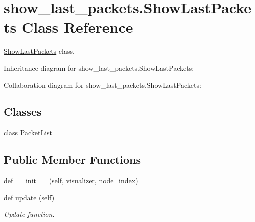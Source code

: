 \hypertarget{classshow__last__packets_1_1ShowLastPackets}{}\section{show\+\_\+last\+\_\+packets.\+Show\+Last\+Packets Class Reference}
\label{classshow__last__packets_1_1ShowLastPackets}


\hyperlink{classshow__last__packets_1_1ShowLastPackets}{Show\+Last\+Packets} class.  




Inheritance diagram for show\+\_\+last\+\_\+packets.\+Show\+Last\+Packets\+:


Collaboration diagram for show\+\_\+last\+\_\+packets.\+Show\+Last\+Packets\+:
\subsection*{Classes}
\begin{DoxyCompactItemize}
\item 
class \hyperlink{classshow__last__packets_1_1ShowLastPackets_1_1PacketList}{Packet\+List}
\end{DoxyCompactItemize}
\subsection*{Public Member Functions}
\begin{DoxyCompactItemize}
\item 
def \hyperlink{classshow__last__packets_1_1ShowLastPackets_aea1733d85857720dee3ff00609c7e521}{\+\_\+\+\_\+init\+\_\+\+\_\+} (self, \hyperlink{classshow__last__packets_1_1ShowLastPackets_aafe3eb5d6509654089b644b42c63f177}{visualizer}, node\+\_\+index)
\item 
def \hyperlink{classshow__last__packets_1_1ShowLastPackets_ae4f9f8241b597d24fae44135b66787db}{update} (self)
\begin{DoxyCompactList}\small\item\em Update function. \end{DoxyCompactList}\end{DoxyCompactItemize}
